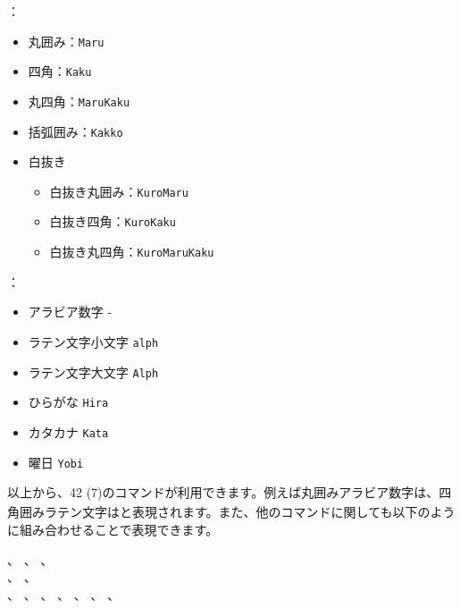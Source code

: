 \documentclass[uplatex, dvipdfmx, paper=a4paper, line_length=45zw, head_space=7zw, foot_space=10zw]{jlreq}
\newcommand{\phrase}[1]{\texttt{#1}}
\begin{document}
\medskip
\hfil
\begin{minipage}[t]{0.45\linewidth}
  ：\vspace{-0.8zw}
  \begin{itemize}
    \item 丸囲み：{\ibmfamily {}}\phrase{Maru}
    \item 四角：{\ibmfamily {}}\phrase{Kaku}
    \item 丸四角：{\ibmfamily {}}\phrase{MaruKaku}
    \item 括弧囲み：{\ibmfamily {}}\phrase{Kakko}
    \item 白抜き
      \begin{itemize}
        \item 白抜き丸囲み：{\ibmfamily {}}\phrase{KuroMaru}
        \item 白抜き四角：{\ibmfamily {}}\phrase{KuroKaku}
        \item 白抜き丸四角：{\ibmfamily {}}\phrase{KuroMaruKaku}
      \end{itemize}
  \end{itemize}
\end{minipage}
\hfil
\begin{minipage}[t]{0.3\linewidth}
  ：\vspace{-0.8zw}
  \begin{itemize}
    \item アラビア数字 -
    \item ラテン文字小文字 \phrase{alph}
    \item ラテン文字大文字 \phrase{Alph}
    \item ひらがな \phrase{Hira}
    \item カタカナ \phrase{Kata}
    \item 曜日 \phrase{Yobi}
  \end{itemize}
\end{minipage}
\hfil
\bigskip

以上から、42 (7\textsubscript{}\textsubscript{})のコマンドが利用できます。例えば丸囲みアラビア数字は、四角囲みラテン文字はと表現されます。また、他のコマンドに関しても以下のように組み合わせることで表現できます。

\begin{demosource}
  、
  、
  、\\
  、
  、\\
  、
  \tcblower
  \ibmfamily
  、
  、
  、
  、
  、
  、
\end{demosource}
\end{document}
